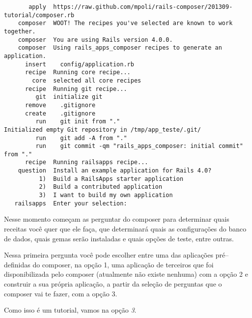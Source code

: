 \documentclass[bidi]{tufte-handout}
\begin{document}
\begin{verbatim}
       apply  https://raw.github.com/mpoli/rails-composer/201309-tutorial/composer.rb
    composer  WOOT! The recipes you've selected are known to work together.
    composer  You are using Rails version 4.0.0.
    composer  Using rails_apps_composer recipes to generate an application.
      insert    config/application.rb
      recipe  Running core recipe...
        core  selected all core recipes
      recipe  Running git recipe...
         git  initialize git
      remove    .gitignore
      create    .gitignore
         run    git init from "."
Initialized empty Git repository in /tmp/app_teste/.git/
         run    git add -A from "."
         run    git commit -qm "rails_apps_composer: initial commit" from "."
      recipe  Running railsapps recipe...
    question  Install an example application for Rails 4.0?
          1)  Build a RailsApps starter application
          2)  Build a contributed application
          3)  I want to build my own application
   railsapps  Enter your selection:

\end{verbatim}

Nesse momento começam as perguntar do composer para determinar quais receitas você quer que ele faça, que determinará quais as configurações do banco de dados, quais gemas serão instaladas e quais opções de teste, entre outras.

Nessa primeira pergunta você pode escolher entre uma das aplicações pré--definidas do composer, na opção 1, uma aplicação de terceiros que foi disponibilizada pelo composer (atualmente não existe nenhuma) com a opção 2 e construir a sua própria aplicação, a partir da seleção de perguntas que o composer vai te fazer, com a opção 3.

Como isso é um tutorial, vamos na opção \emph{3}.
\end{document}
